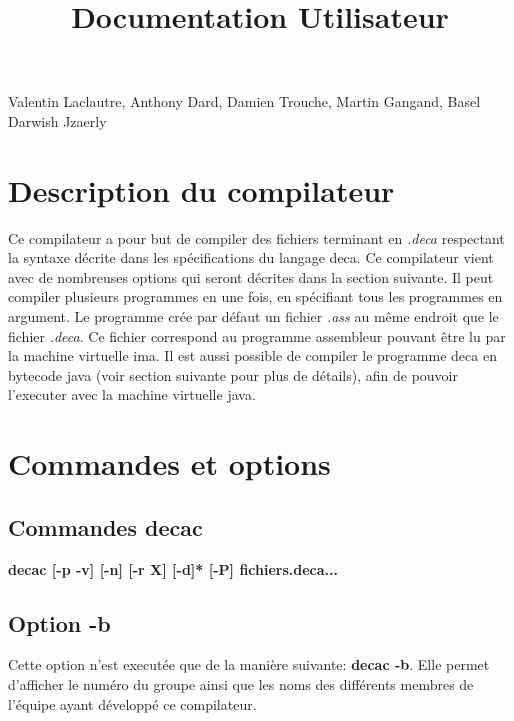\documentclass[12pt, a4paper, one side]{article}
\title{Documentation Utilisateur}
\author{}
\date{}
\begin{document}
    \maketitle

    \begin{center}
        Valentin Laclautre, Anthony Dard, Damien Trouche, Martin Gangand, Basel Darwish Jzaerly
    \end{center}

    \tableofcontents

    \newpage

    \section{Description du compilateur}

    Ce compilateur a pour but de compiler des fichiers terminant en \textit{.deca}
    respectant la syntaxe décrite dans les spécifications du langage deca. Ce compilateur
    vient avec de nombreuses options qui seront décrites dans la section suivante. Il
    peut compiler plusieurs programmes en une fois, en spécifiant tous les programmes
    en argument. Le programme crée par défaut un fichier \textit{.ass} au même endroit que
    le fichier \textit{.deca}. Ce fichier correspond au programme assembleur pouvant être lu
    par la machine virtuelle ima. Il est aussi possible de compiler le programme deca en
    bytecode java (voir section suivante pour plus de détails), afin de pouvoir l'executer
    avec la machine virtuelle java.

    \section{Commandes et options}

    \subsection{Commandes decac}

    \textbf{decac [-p \textbar -v] [-n] [-r X] [-d]* [-P] fichiers.deca... \textbar [-b]}

    \subsection{Option -b}

    Cette option n'est executée que de la manière suivante: \textbf{decac -b}. Elle permet
    d'afficher le numéro du groupe ainsi que les noms des différents membres de l'équipe
    ayant développé ce compilateur.
\end{document}

